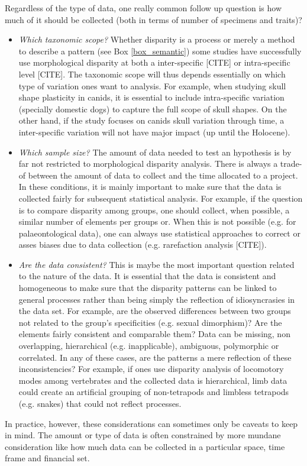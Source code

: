 \documentclass[12pt,letterpaper]{article}
\begin{document}
Regardless of the type of data, one really common follow up question is how much of it should be collected (both in terms of number of specimens and traits)?
\begin{itemize}
    \item \textit{Which taxonomic scope?}
    Whether disparity is a process or merely a method to describe a pattern (see Box \ref{box_semantic}) some studies have successfully use morphological disparity at both a inter-specific [CITE] or intra-specific level [CITE].
    The taxonomic scope will thus depends essentially on which type of variation ones want to analysis.
    For example, when studying skull shape plasticity in canids, it is essential to include intra-specific variation (specially domestic dogs) to capture the full scope of skull shapes.
    On the other hand, if the study focuses on canids skull variation through time, a inter-specific variation will not have major impact (up until the Holocene). %
    \item \textit{Which sample size?}
    The amount of data needed to test an hypothesis is by far not restricted to morphological disparity analysis.
    There is always a trade-of between the amount of data to collect and the time allocated to a project.
    In these conditions, it is mainly important to make sure that the data is collected fairly for subsequent statistical analysis.
    For example, if the question is to compare disparity among groups, one should collect, when possible, a similar number of elements per groups or.
    When this is not possible (e.g. for palaeontological data), one can always use statistical approaches to correct or asses biases due to data collection (e.g. rarefaction analysis [CITE]).
    \item \textit{Are the data consistent?}
    This is maybe the most important question related to the nature of the data.
    It is essential that the data is consistent and homogeneous to make sure that the disparity patterns can be linked to general processes rather than being simply the reflection of idiosyncrasies in the data set.
    For example, are the observed differences between two groups not related to the group's specificities (e.g. sexual dimorphism)?
    Are the elements fairly consistent and comparable them?
    Data can be missing, non overlapping, hierarchical (e.g. inapplicable), ambiguous, polymorphic or correlated.
    In any of these cases, are the patterns a mere reflection of these inconsistencies?
    For example, if ones use disparity analysis of locomotory modes among vertebrates and the collected data is hierarchical, limb data could create an artificial grouping of non-tetrapods and limbless tetrapods (e.g. snakes) that could not reflect processes.
\end{itemize}
In practice, however, these considerations can sometimes only be caveats to keep in mind.
The amount or type of data is often constrained by more mundane consideration like how much data can be collected in a particular space, time frame and financial set. 
\end{document}
